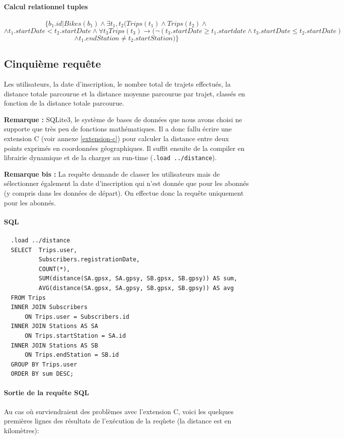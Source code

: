 \documentclass[a4paper]{article}
\begin{document}
    \paragraph{Calcul relationnel tuples}
    $$ \{ b_1.id | Bikes(b_1) \land \exists t_1, t_2 (Trips(t_1) \land Trips(t_2) \land $$
    $$ \land t_1.startDate < t_2.startDate \land \forall t_3 Trips(t_3) \rightarrow (\lnot (t_3.startDate \geq t_1.startdate \land t_3.startDate \leq t_2.startDate)$$
    $$ \land t_1.endStation \neq t_2.startStation)\}$$

\subsection{Cinquième requête}
    Les utilisateurs, la date d'inscription, le nombre total de trajets effectués, la distance totale parcourue et la distance moyenne parcourue par trajet, classés en fonction de la distance totale parcourue.
    
    \textbf{Remarque :} SQLite3, le système de bases de données que nous avons choisi ne supporte que très peu de fonctions mathématiques. Il a donc fallu écrire une extension C (voir annexe \ref{extension-c}) pour calculer la distance entre deux points exprimés en coordonnées géographiques. Il suffit ensuite de la compiler en librairie dynamique et de la charger au run-time (\texttt{.load ../distance}).
    
    \textbf{Remarque bis :} La requête demande de classer les utilisateurs mais de sélectionner également la date d'inscription qui n'est donnée que pour les abonnés (y compris dans les données de départ). On effectue donc la requête uniquement pour les abonnés.

    \paragraph{SQL}
  \begin{verbatim}
  .load ../distance
  SELECT  Trips.user, 
          Subscribers.registrationDate, 
          COUNT(*), 
          SUM(distance(SA.gpsx, SA.gpsy, SB.gpsx, SB.gpsy)) AS sum,
          AVG(distance(SA.gpsx, SA.gpsy, SB.gpsx, SB.gpsy)) AS avg
  FROM Trips
  INNER JOIN Subscribers
      ON Trips.user = Subscribers.id
  INNER JOIN Stations AS SA
      ON Trips.startStation = SA.id
  INNER JOIN Stations AS SB
      ON Trips.endStation = SB.id
  GROUP BY Trips.user
  ORDER BY sum DESC;
  \end{verbatim}
  
  \paragraph{Sortie de la requête SQL} Au cas où surviendraient des problèmes avec l'extension C, voici les quelques premières lignes des résultats de l'exécution de la reqûete (la distance est en kilomètres):
    
\end{document}
